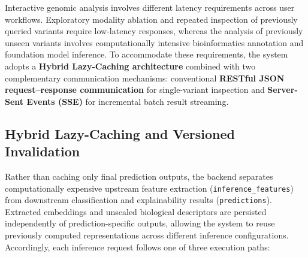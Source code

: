 Interactive genomic analysis involves different latency requirements across user workflows. Exploratory modality ablation and repeated inspection of previously queried variants require low-latency responses, whereas the analysis of previously unseen variants involves computationally intensive bioinformatics annotation and foundation model inference. To accommodate these requirements, the system adopts a \textbf{Hybrid Lazy-Caching architecture} combined with two complementary communication mechanisms: conventional \textbf{RESTful JSON request--response communication} for single-variant inspection and \textbf{Server-Sent Events (SSE)} for incremental batch result streaming.

\subsection{Hybrid Lazy-Caching and Versioned Invalidation}

Rather than caching only final prediction outputs, the backend separates computationally expensive upstream feature extraction (\texttt{inference\_features}) from downstream classification and explainability results (\texttt{predictions}). Extracted embeddings and unscaled biological descriptors are persisted independently of prediction-specific outputs, allowing the system to reuse previously computed representations across different inference configurations. Accordingly, each inference request follows one of three execution paths:

